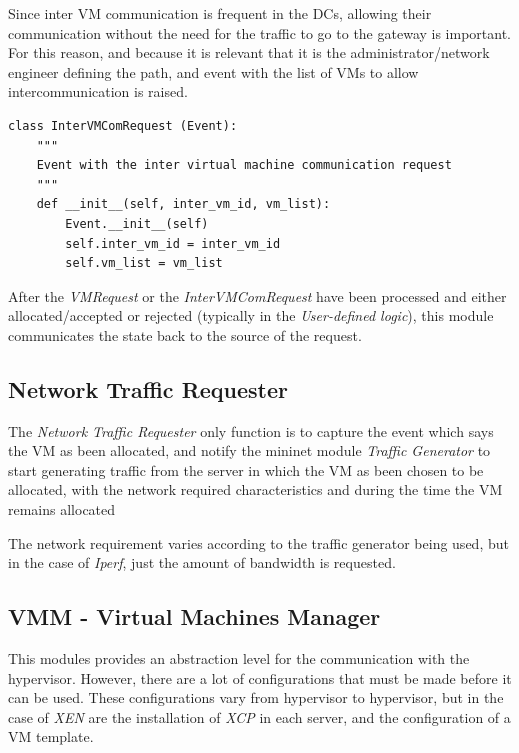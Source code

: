 \documentclass[12pt,english,oneside]{book}
\begin{document}
Since inter VM communication is frequent in the DCs, allowing their communication without the need for the traffic to go to the gateway is important. For this reason, and because it is relevant that it is the administrator/network engineer defining the path, and event with the list of VMs to allow intercommunication is raised.

\begin{verbatim}
class InterVMComRequest (Event):
    """
    Event with the inter virtual machine communication request
    """
    def __init__(self, inter_vm_id, vm_list):
        Event.__init__(self)
        self.inter_vm_id = inter_vm_id
        self.vm_list = vm_list
\end{verbatim}

After the \textit{VMRequest} or the \textit{InterVMComRequest} have been processed and either allocated/accepted or rejected (typically in the \textit{User-defined logic}), this module communicates the state back to the source of the request.

\subsection{Network Traffic Requester}
\hspace{0.6cm}

The \textit{Network Traffic Requester} only function is to capture the event which says the VM as been allocated, and notify the mininet module \textit{Traffic Generator} to start generating traffic from the server in which the VM as been chosen to be allocated, with the network required characteristics and during the time the VM remains allocated

The network requirement varies according to the traffic generator being used, but in the case of \textit{Iperf}, just the amount of bandwidth is requested.

\subsection{VMM - Virtual Machines Manager}
\hspace{0.6cm}

This modules provides an abstraction level for the communication with the hypervisor. However, there are a lot of configurations that must be made before it can be used. These configurations vary from hypervisor to hypervisor, but in the case of \textit{XEN} are the installation of \textit{XCP} in each server, and the configuration of a VM template.
\end{document}
